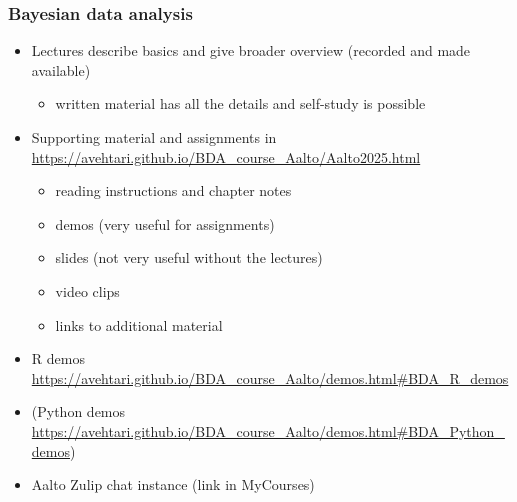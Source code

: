 \documentclass[english,t]{beamer}
\begin{document}
\begin{frame}
  \frametitle{Bayesian data analysis}  %

  \begin{itemize}
  \item Lectures describe basics and give broader overview (recorded
    and made available)
    \begin{itemize}
    \item written material has all the details and self-study
      is possible
    \end{itemize}
  \item Supporting material and assignments in
    {\small\url{https://avehtari.github.io/BDA_course_Aalto/Aalto2025.html}}
    \begin{itemize}
    \item reading instructions and chapter notes
    \item demos (very useful for assignments)
    \item slides (not very useful without the lectures)
    \item video clips
    \item links to additional material
    \end{itemize}
   \item R demos {\small\url{https://avehtari.github.io/BDA_course_Aalto/demos.html\#BDA_R_demos}}
  \item (Python demos {\small\url{https://avehtari.github.io/BDA_course_Aalto/demos.html\#BDA_Python_demos})}
  \item Aalto Zulip chat instance (link in MyCourses)
  \end{itemize}

\end{frame}
\end{document}
